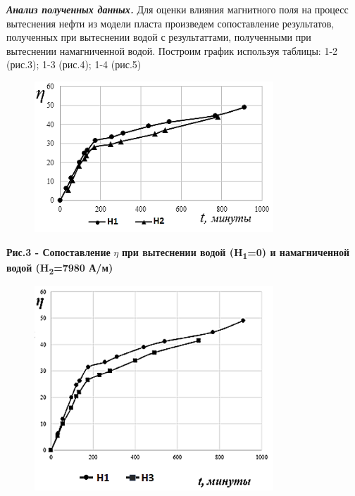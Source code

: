 {{%

\emph{{\bfseries Анализ полученных данных.}} Для оценки влияния магнитного
поля на процесс вытеснения нефти из модели пласта произведем
сопоставление результатов, полученных при вытеснении водой с
результаттами, полученными при вытеснении намагниченной водой. Построим
график используя таблицы: 1-2 (рис.3); 1-3 (рис.4); 1-4 (рис.5)

\begin{figure}[H]
	\centering
	\includegraphics[width=0.8\textwidth]{media/gorn4/image4}
	\caption*{}
\end{figure}


{\bfseries Рис.3 - Сопоставление} \(\eta\) {\bfseries при вытеснении водой
(H\textsubscript{1}=0) и намагниченной водой (H\textsubscript{2}=7980
А/м)}

\begin{figure}[H]
	\centering
	\includegraphics[width=0.8\textwidth]{media/gorn4/image5}
	\caption*{}
\end{figure}


}}
